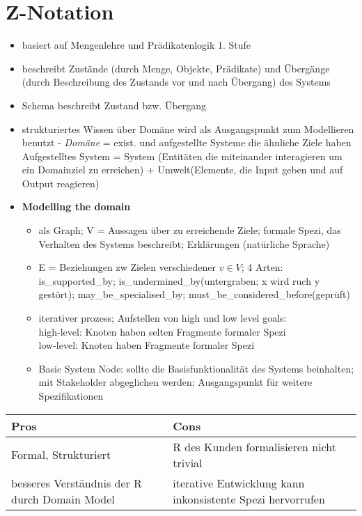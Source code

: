 \section{Z-Notation}
\begin{itemize}
	\item basiert auf Mengenlehre und Prädikatenlogik 1. Stufe
	\item beschreibt Zustände (durch Menge, Objekte, Prädikate) und Übergänge (durch Beschreibung des Zustands vor und nach Übergang) des Systems
	\item Schema beschreibt Zustand bzw. Übergang
	\item strukturiertes Wissen über Domäne wird als Ausgangspunkt zum Modellieren benutzt - \textit{Domäne} = exist. und aufgestellte Systeme die ähnliche Ziele haben\\
	Aufgestelltes System = System (Entitäten die miteinander interagieren um ein Domainziel zu erreichen) + Umwelt(Elemente, die Input geben und auf Output reagieren)
	\item \textbf{Modelling the domain}
	\begin{itemize}
		\item als Graph; V = Aussagen über zu erreichende Ziele; formale Spezi, das Verhalten des Systems beschreibt; Erklärungen (natürliche Sprache)
		\item E = Beziehungen zw Zielen verschiedener $v \in V$; 4 Arten:\\
		is\_supported\_by; is\_undermined\_by(untergraben; x wird ruch y gestört); may\_be\_specialised\_by; must\_be\_considered\_before(geprüft)
		\item iterativer prozess; Aufstellen von high und low level goals:\\
		high-level: Knoten haben selten Fragmente formaler Spezi\\
		low-level: Knoten haben Fragmente formaler Spezi
		\item Basic System Node: sollte die Basisfunktionalität des Systems beinhalten; mit Stakeholder abgeglichen werden; Ausgangspunkt für weitere Spezifikationen
	\end{itemize}
\end{itemize}

\begin{table}[!h]
	\centering
	\begin{tabular}{|p{20em}|p{20em}|}
		\hline
		Pros	& Cons\\
		\hline
		Formal, Strukturiert	& R des Kunden formalisieren nicht trivial\\
		besseres Verständnis der R durch Domain Model	& iterative Entwicklung kann inkonsistente Spezi hervorrufen\\
		\hline
	\end{tabular}
\end{table}